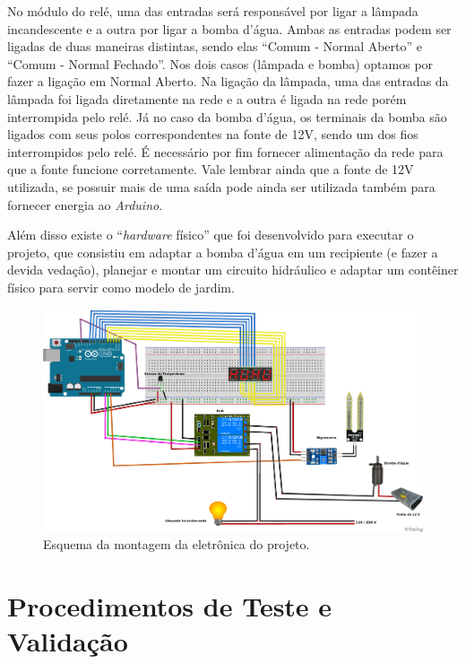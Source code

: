 \documentclass[a4paper,12pt]{article}
\begin{document}
    No módulo do relé, uma das entradas será responsável por ligar a lâmpada incandescente e a outra por ligar a bomba d’água. Ambas as entradas podem ser ligadas de duas maneiras distintas, sendo elas “Comum - Normal Aberto” e “Comum - Normal Fechado”. Nos dois casos (lâmpada e bomba) optamos por fazer a ligação em Normal Aberto. Na ligação da lâmpada, uma das entradas da lâmpada foi ligada diretamente na rede e a outra é ligada na rede porém interrompida pelo relé. Já no caso da bomba d’água, os terminais da bomba são ligados com seus polos correspondentes na fonte de 12V, sendo um dos fios interrompidos pelo relé. É necessário por fim fornecer alimentação da rede para que a fonte funcione corretamente. Vale lembrar ainda que a fonte de 12V utilizada, se possuir mais de uma saída pode ainda ser utilizada também para fornecer energia ao \textit{Arduino}.

    Além disso existe o “\textit{hardware} físico” que foi desenvolvido para executar o projeto, que consistiu em adaptar a bomba d’água em um recipiente (e fazer a devida vedação), planejar e montar um circuito hidráulico e adaptar um contêiner físico para servir como modelo de jardim.



		\begin{figure}[!ht]
		  \centering
		    \includegraphics[width=1\textwidth]{EsquemaEletronica.png}
		    \caption{Esquema da montagem da eletrônica do projeto.}
		\end{figure}




\newpage
\section{Procedimentos de Teste e Validação}
\end{document}
